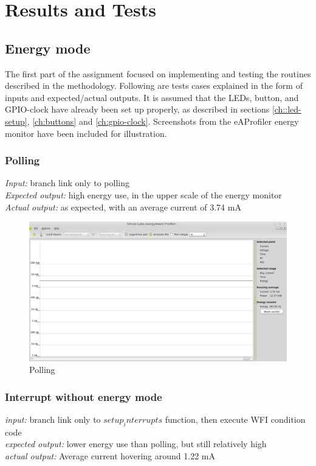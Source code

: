 \section{Results and Tests}

\subsection{Energy mode}
The first part of the assignment focused on implementing and testing the routines described in the methodology. Following are tests cases explained in the form of inputs and expected/actual outputs. It is assumed that the LEDs, button, and GPIO-clock have already been set up properly, as described in sections \ref{ch::led-setup}, \ref{ch:buttons} and \ref{ch:gpio-clock}.
Screenshots from the eAProfiler energy monitor have been included for illustration.

	\subsubsection{Polling}
	\emph{Input: } branch link only to polling \\
	\emph{Expected output: } high energy use, in the upper scale of the energy monitor \\
	\emph{Actual output: } as expected, with an average current of 3.74 mA
	
	\begin{center}
		\begin{figure}[H]
			\includegraphics[width=\textwidth]{fig/polling.png}
			\caption{Polling}
		\end{figure}
	\end{center}
	
	
	\subsubsection{Interrupt without energy mode}
	\emph{input: } 
	branch link only to $setup_interrupts$ function, then execute WFI condition code \\
	\emph{expected output: }
	lower energy use than polling, but still relatively high \\
	\emph{actual output: }
	Average current hovering around 1.22 mA
	
